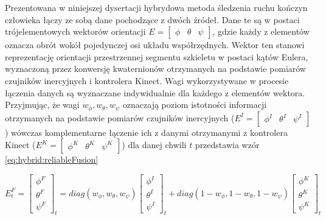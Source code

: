 

Prezentowana w niniejszej dysertacji hybrydowa metoda śledzenia ruchu kończyn człowieka łączy ze sobą dane pochodzące z dwóch źródeł. Dane te są w postaci trójelementowych wektorów orientacji $E = \begin{bmatrix} \phi &  \theta & \psi \end{bmatrix}$, gdzie każdy z elementów oznacza obrót wokół pojedynczej osi układu współrzędnych. Wektor ten stanowi reprezentację orientacji przestrzennej segmentu szkieletu w postaci kątów Eulera, wyznaczoną przez konwersję kwaternionów otrzymanych na podstawie pomiarów czujników inercyjnych i kontrolera Kinect. Wagi wykorzystywane w procesie łączenia danych są wyznaczane indywidualnie dla każdego z elementów wektora. Przyjmując, że wagi $w_\phi , w_\theta , w_\psi$ oznaczają poziom istotności informacji otrzymanych na podstawie pomiarów czujników inercyjnych ($E^I = \begin{bmatrix}  \phi^I &  \theta^I &  \psi^I \end{bmatrix}$) wówczas komplementarne łączenie ich z danymi otrzymanymi z kontrolera Kinect ($E^K = \begin{bmatrix}  \phi^K &  \theta^K &  \psi^K \end{bmatrix}$) dla danej chwili $t$ przedstawia wzór \eqref{eq:hybrid:reliableFusion}

\begin{equation} E^F_t = 
	\begin{bmatrix}  \phi^F \\  \theta^F \\  \psi^F \end{bmatrix}_t = 
	diag(w_\phi,w_\theta,w_\psi)
	\begin{bmatrix}  \phi^I \\  \theta^I \\  \psi^I \end{bmatrix}_t + 
	diag(1-w_\phi,1-w_\theta,1-w_\psi)
	\begin{bmatrix}  \phi^K \\  \theta^K \\  \psi^K \end{bmatrix}_t
	\label{eq:hybrid:reliableFusion}
\end{equation}

